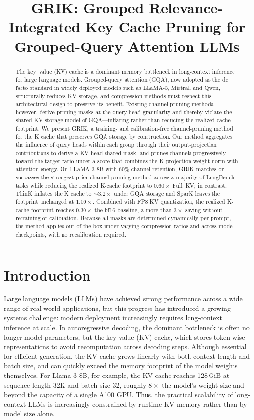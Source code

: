\documentclass{article}
\title{GRIK: Grouped Relevance-Integrated Key Cache Pruning for Grouped-Query Attention LLMs}
\begin{document}
\maketitle

\begin{abstract}
The key–value (KV) cache is a dominant memory bottleneck in long-context inference for large language models. Grouped-query attention (GQA), now adopted as the de facto standard in widely deployed models such as LLaMA-3, Mistral, and Qwen, structurally reduces KV storage, and compression methods must respect this architectural design to preserve its benefit. Existing channel-pruning methods, however, derive pruning masks at the query-head granularity and thereby violate the shared-KV storage model of GQA—inflating rather than reducing the realized cache footprint. We present GRIK, a training- and calibration-free channel-pruning method for the K cache that preserves GQA storage by construction. Our method aggregates the influence of query heads within each group through their output-projection contributions to derive a KV-head-shared mask, and prunes channels progressively toward the target ratio under a score that combines the K-projection weight norm with attention energy. On LLaMA-3-8B with 60\% channel retention, GRIK matches or surpasses the strongest prior channel-pruning method across a majority of LongBench tasks while reducing the realized K-cache footprint to $0.60\times$ Full~KV; in contrast, ThinK inflates the K cache to $\sim\!3.2\times$ under GQA storage and SparK leaves the footprint unchanged at $1.00\times$. Combined with FP8 KV quantization, the realized K-cache footprint reaches $0.30\times$ the bf16 baseline, a more than $3\times$ saving without retraining or calibration. Because all masks are determined dynamically per prompt, the method applies out of the box under varying compression ratios and across model checkpoints, with no recalibration required.
\end{abstract}


\section{Introduction}
\label{sec:intro}
Large language models (LLMs) have achieved strong performance across a wide range of real-world applications, but this progress has introduced a growing systems challenge: modern deployment increasingly requires long-context inference at scale. In autoregressive decoding, the dominant bottleneck is often no longer model parameters, but the key-value (KV) cache, which stores token-wise representations to avoid recomputation across decoding steps. Although essential for efficient generation, the KV cache grows linearly with both context length and batch size, and can quickly exceed the memory footprint of the model weights themselves. For Llama-3-8B, for example, the KV cache reaches 128\,GiB at sequence length 32K and batch size 32, roughly \(8\times\) the model's weight size and beyond the capacity of a single A100 GPU. Thus, the practical scalability of long-context LLMs is increasingly constrained by runtime KV memory rather than by model size alone.
\end{document}
